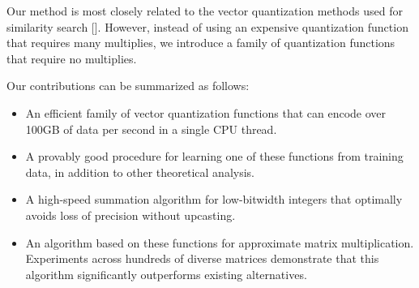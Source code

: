 




Our method is most closely related to the vector quantization methods used for similarity search []. However, instead of using an expensive quantization function that requires many multiplies, we introduce a family of quantization functions that require no multiplies. %

Our contributions can be summarized as follows:
\begin{itemize}\itemsep0em
    \item An efficient family of vector quantization functions that can encode over 100GB of data per second in a single CPU thread.
    \item A provably good procedure for learning one of these functions from training data, in addition to other theoretical analysis.
    \item A high-speed summation algorithm for low-bitwidth integers that optimally avoids loss of precision without upcasting.
    \item An algorithm based on these functions for approximate matrix multiplication. Experiments across hundreds of diverse matrices demonstrate that this algorithm significantly outperforms existing alternatives.
\end{itemize}

